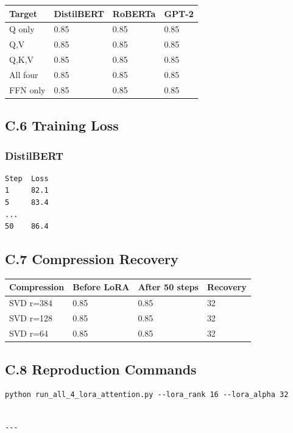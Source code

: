 \begin{table}[H]
\centering
\small
\begin{tabular}{llll}
\toprule
\textbf{Target} & \textbf{DistilBERT} & \textbf{RoBERTa} & \textbf{GPT-2} \\
\midrule
Q only & 0.85 & 0.85 & 0.85 \\
Q,V & 0.85 & 0.85 & 0.85 \\
Q,K,V & 0.85 & 0.85 & 0.85 \\
All four & 0.85 & 0.85 & 0.85 \\
FFN only & 0.85 & 0.85 & 0.85 \\
\bottomrule
\end{tabular}
\end{table}

\subsection{C.6 Training Loss}

\subsubsection{DistilBERT}
\begin{lstlisting}
Step  Loss
1     82.1
5     83.4
...
50    86.4
\end{lstlisting}

\subsection{C.7 Compression Recovery}

\begin{table}[H]
\centering
\small
\begin{tabular}{llll}
\toprule
\textbf{Compression} & \textbf{Before LoRA} & \textbf{After 50 steps} & \textbf{Recovery} \\
\midrule
SVD r=384 & 0.85 & 0.85 & 32 \\
SVD r=128 & 0.85 & 0.85 & 32 \\
SVD r=64 & 0.85 & 0.85 & 32 \\
\bottomrule
\end{tabular}
\end{table}

\subsection{C.8 Reproduction Commands}

\begin{lstlisting}
python run_all_4_lora_attention.py --lora_rank 16 --lora_alpha 32
\end{lstlisting}
\begin{lstlisting}

---
\end{lstlisting}

